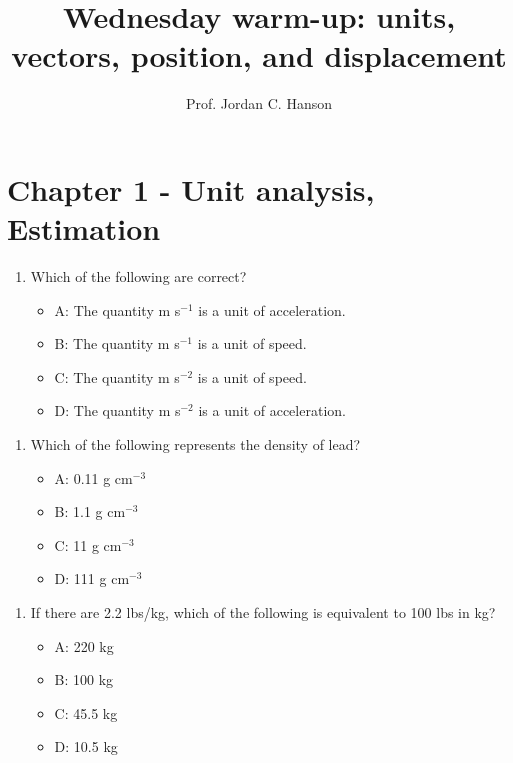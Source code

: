 \documentclass{article}
\begin{document}
\twocolumn

\title{Wednesday warm-up: units, vectors, position, and displacement}
\author{Prof. Jordan C. Hanson}

\maketitle

\section{Chapter 1 - Unit analysis, \\ Estimation}

\begin{enumerate}
\item Which of the following are correct?
\begin{itemize}
\item A: The quantity m s$^{-1}$ is a unit of acceleration.
\item B: The quantity m s$^{-1}$ is a unit of speed.
\item C: The quantity m s$^{-2}$ is a unit of speed.
\item D: The quantity m s$^{-2}$ is a unit of acceleration.
\end{itemize}
\end{enumerate}

\begin{enumerate}
\item Which of the following represents the density of lead?
\begin{itemize}
\item A: 0.11 g cm$^{-3}$
\item B: 1.1 g cm$^{-3}$
\item C: 11 g cm$^{-3}$
\item D: 111 g cm$^{-3}$
\end{itemize}
\end{enumerate}

\begin{enumerate}
\item If there are 2.2 lbs/kg, which of the following is equivalent to 100 lbs in kg?
\begin{itemize}
\item A: 220 kg
\item B: 100 kg
\item C: 45.5 kg
\item D: 10.5 kg
\end{itemize}
\end{enumerate}
\end{document}
